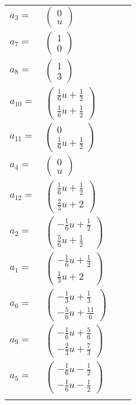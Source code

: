 \documentclass[1p]{elsarticle_modified}
\theoremstyle{definition}
\begin{document}
\begin{tabular}{m{7pt} m{180pt} m{7pt} m{180pt} }
\flushright $a_{3}=$&$\begin{pmatrix}0\\u\end{pmatrix}$ \\
\flushright $a_{7}=$&$\begin{pmatrix}1\\0\end{pmatrix}$ \\
\flushright $a_{8}=$&$\begin{pmatrix}1\\3\end{pmatrix}$ \\
\flushright $a_{10}=$&$\begin{pmatrix}\frac{1}{6} u+\frac{1}{2}\\\frac{1}{6} u+\frac{1}{2}\end{pmatrix}$ \\
\flushright $a_{11}=$&$\begin{pmatrix}0\\\frac{1}{6} u+\frac{1}{2}\end{pmatrix}$ \\
\flushright $a_{4}=$&$\begin{pmatrix}0\\u\end{pmatrix}$ \\
\flushright $a_{12}=$&$\begin{pmatrix}\frac{1}{6} u+\frac{1}{2}\\\frac{2}{3} u+2\end{pmatrix}$ \\
\flushright $a_{2}=$&$\begin{pmatrix}-\frac{1}{6} u+\frac{1}{2}\\\frac{5}{6} u+\frac{1}{2}\end{pmatrix}$ \\
\flushright $a_{1}=$&$\begin{pmatrix}-\frac{1}{6} u+\frac{1}{2}\\\frac{1}{3} u+2\end{pmatrix}$ \\
\flushright $a_{6}=$&$\begin{pmatrix}-\frac{1}{3} u+\frac{1}{3}\\-\frac{5}{6} u+\frac{11}{6}\end{pmatrix}$ \\
\flushright $a_{9}=$&$\begin{pmatrix}-\frac{1}{6} u+\frac{5}{6}\\-\frac{2}{3} u+\frac{7}{3}\end{pmatrix}$ \\
\flushright $a_{5}=$&$\begin{pmatrix}-\frac{1}{6} u-\frac{1}{2}\\-\frac{1}{6} u-\frac{1}{2}\end{pmatrix}$\\&\end{tabular}
\end{document}
